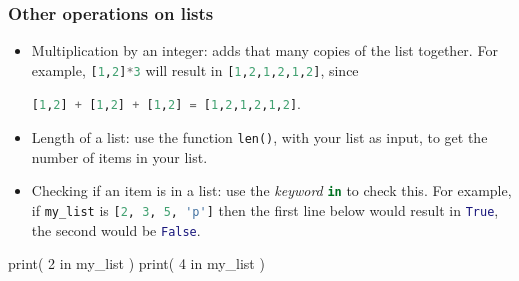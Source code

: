 \documentclass{beamer}
\newenvironment{codeblock}
    {\hfill\begin{beamerboxesrounded}[lower=codecol, width=0.8\textwidth]
    \medskip

    }
    { 
    \end{beamerboxesrounded}\hfill
    }
\theoremstyle{example}
\newcommand{\ct}[1]{\lstinline[language=Python,basicstyle=\ttfamily\footnotesize,stringstyle=\small\color{strings}]!#1!}
\newcommand{\ttt}[1]{{\small\texttt{#1}}}
\newcommand{\comment}[1]{}
\begin{document}
\begin{frame}[fragile]
\frametitle{Other operations on lists}

\begin{itemize}
	\item Multiplication by an integer: adds that many copies of the list together. For example, \ct{[1,2]*3} will result in \ct{[1,2,1,2,1,2]}, since 
	\begin{center}\ct{[1,2] + [1,2] + [1,2] = [1,2,1,2,1,2]}.
	\end{center}
	\pause
	\item Length of a list: use the function \ttt{len()}, with your list as input, to get the number of items in your list.
	\pause
	\item Checking if an item is in a list: use the \emph{keyword} \ct{in} to check this. For example, if \ct{my_list} is \ct{[2, 3, 5, 'p']} then the first line below would result in \ct{True}, the second would be \ct{False}.
\end{itemize}

\begin{codeblock}

\begin{python}
print( 2 in my_list )
print( 4 in my_list )
\end{python}

\end{codeblock}

\end{frame}

\comment{
\begin{frame}
\frametitle{Strings and other sequential types}

\begin{itemize}
	\item Some other sequential types: {\ttb tuple}, {\ttb range}.
	\item The operations we discussed (on lists) will work in same way on these.

	\item Final important sequential type: {\ttb str}, ``strings.''
	\begin{itemize}
		\item a sequence of \emph{characters}, from your keyboard
	\end{itemize}
	\item Above, the variable that was assigned \ttt{'Chris Cornwell'}, and the item \ttt{'p'} in \ttt{my}\ct{_}\ttt{list}, each is a string.
	\item \emph{Thinking} of a string as a list of single characters, operations on strings work like they do on lists (e.g., \ttt{+} will concatenate and \ttt{len()} gives the number of characters, etc. 
\end{itemize}
\end{frame}
}
\end{document}
